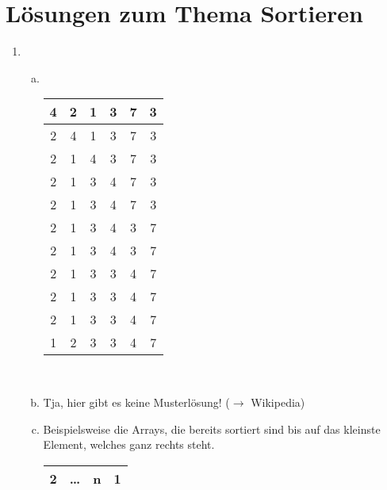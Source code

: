 \documentclass{scrartcl}
\begin{document}
\section*{L\"osungen zum Thema Sortieren}
\begin{enumerate}[(1)]

\item
\begin{enumerate}[(a)]
\item
\text{ } \\
\begin{center}
\begin{tabular}{|c|c|c|c|c|c|}
\hline
4 & 2 & 1 & 3 & 7 & 3 \\
\hline
2 & 4 & 1 & 3 & 7 & 3 \\
\hline
2 & 1 & 4 & 3 & 7 & 3 \\
\hline
2 & 1 & 3 & 4 & 7 & 3 \\
\hline
2 & 1 & 3 & 4 & 7 & 3 \\
\hline
2 & 1 & 3 & 4 & 3 & 7 \\
\hline
2 & 1 & 3 & 4 & 3 & 7 \\
\hline
2 & 1 & 3 & 3 & 4 & 7 \\
\hline
2 & 1 & 3 & 3 & 4 & 7 \\
\hline
2 & 1 & 3 & 3 & 4 & 7 \\
\hline
1 & 2 & 3 & 3 & 4 & 7 \\
\hline
\end{tabular}
\end{center}
\text{} \\
\item Tja, hier gibt es keine Musterl\"osung! ($\rightarrow$ Wikipedia)
\item Beispielsweise die Arrays, die bereits sortiert sind bis auf das kleinste Element, welches ganz rechts steht.
\text{ } \\
\begin{center}
\begin{tabular}{|c|c|c|c|}
\hline
2 & \ldots & n & 1 \\
\hline
\end{tabular}
\end{center}
\end{enumerate}
\end{enumerate}
\end{document}
